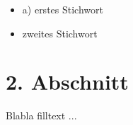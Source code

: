 \documentclass[a4paper,10pt]{article}
\begin{document}
  \begin{itemize}
  \item{a)} erstes Stichwort
  \item zweites Stichwort
  \end{itemize}

  \section{2. Abschnitt}
    Blabla filltext ... \\

  
  
\end{document}

